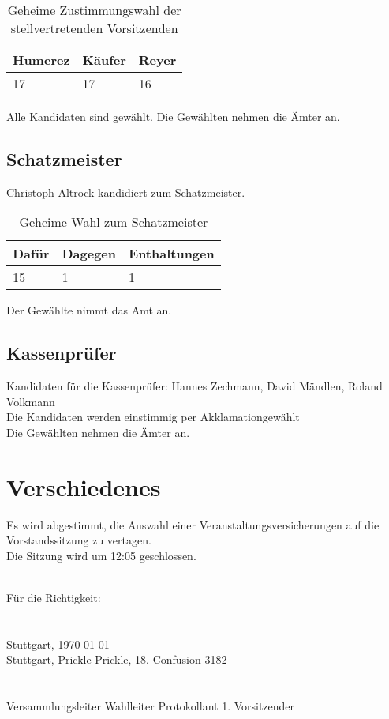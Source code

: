 \documentclass[a4paper]{scrartcl}
\begin{document}
\begin{table}[h]
	\begin{tabularx}{\textwidth}{XXX}
		Humerez & Käufer & Reyer\\
		\toprule
		17 & 17 & 16 \\
	\end{tabularx}
	\caption{Geheime Zustimmungswahl der stellvertretenden Vorsitzenden}
\end{table}
Alle Kandidaten sind gewählt. Die Gewählten nehmen die Ämter an.

\subsection{Schatzmeister}
Christoph Altrock kandidiert zum Schatzmeister.

\begin{table}[h]
	\begin{tabularx}{\textwidth}{XXX}
		Dafür & Dagegen & Enthaltungen\\
		\toprule
		15 & 1 & 1\\
	\end{tabularx}
	\caption{Geheime Wahl zum Schatzmeister}
\end{table}
Der Gewählte nimmt das Amt an.

\subsection{Kassenprüfer}
Kandidaten für die Kassenprüfer: Hannes Zechmann, David Mändlen, Roland Volkmann\\
Die Kandidaten werden einstimmig per Akklamationgewählt\\
Die Gewählten nehmen die Ämter an.

\clearpage

\section{Verschiedenes }

Es wird abgestimmt, die Auswahl einer Veranstaltungsversicherungen auf die Vorstandssitzung zu vertagen.\\

Die  Sitzung wird um 12:05 geschlossen.

\vfill
\mbox{}\\
Für die Richtigkeit:\\
\\
\\
Stuttgart, \today\\
Stuttgart, Prickle-Prickle, 18. Confusion 3182\\
\\
\\
\hfill Versammlungsleiter \hfill Wahlleiter \hfill Protokollant \hfill 1. Vorsitzender \hfill
\end{document}
